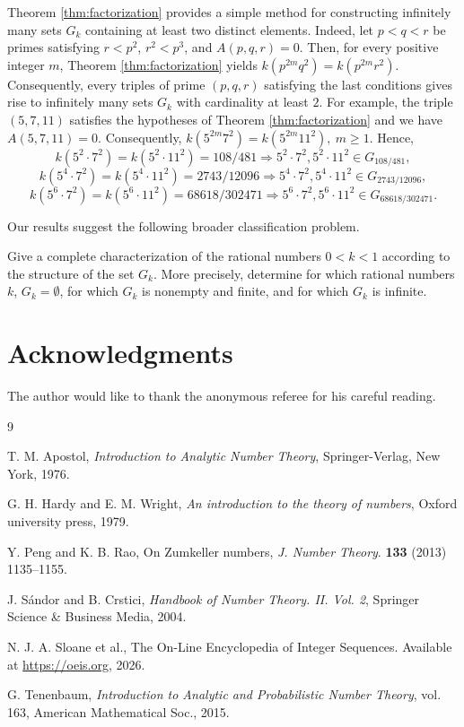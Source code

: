 \documentclass[12pt,reqno]{article}
\begin{document}
\begin{remark}
Theorem \ref{thm:factorization} provides a simple method for constructing infinitely many sets $G_k$ containing at least two distinct elements. Indeed, let \(p<q<r\) be primes satisfying \(r<p^2\), \(r^2<p^3\), and $A(p,q,r)=0$. Then, for every positive integer \(m\), Theorem \ref{thm:factorization} yields $k(p^{2m}q^2)=k(p^{2m}r^2)$. Consequently, every triples of prime \((p,q,r)\) satisfying the last conditions gives rise to infinitely many sets \(G_k\) with cardinality at least \(2\). For example, the triple $(5,7,11)$ satisfies the hypotheses of Theorem \ref{thm:factorization} and we have
$A(5,7,11)=0$. Consequently, $k(5^{2m}7^2)=k(5^{2m}11^2),\ m\ge1$. Hence,
\[
k(5^2\cdot7^2)=k(5^2\cdot11^2)=108/481\Rightarrow 5^2\cdot7^2, 5^2\cdot11^2\in G_{108/481},
\]
\[
k(5^4\cdot7^2)=k(5^4\cdot11^2)=2743/12096\Rightarrow 5^4\cdot7^2, 5^4\cdot11^2\in G_{2743/12096},
\]
\[
k(5^6\cdot7^2)=k(5^6\cdot11^2)=68618/302471\Rightarrow 5^6\cdot7^2, 5^6\cdot11^2\in G_{68618/302471}.
\]
\end{remark}

Our results suggest the following broader classification problem.
\begin{problem}
Give a complete characterization of the rational numbers $0<k<1$ according to the structure of the set
$G_k$. More precisely, determine for which rational numbers $k$, 
$G_k=\emptyset$, for which $G_k$ is nonempty and finite, and for which $G_k$ is infinite.
\end{problem}

\section{Acknowledgments}
The author would like to thank the anonymous referee for his careful reading. 

\begin{thebibliography}{9}

T. M. Apostol, \emph{Introduction to Analytic Number Theory}, Springer-Verlag, New York, 1976.

G. H. Hardy and E. M. Wright, \emph{An introduction to the theory of numbers}, Oxford university press, 1979.

Y. Peng and K. B. Rao, On Zumkeller numbers, \emph{J. Number Theory}. {\bf 133} (2013) 1135--1155.

J. S\'{a}ndor and B. Crstici, \emph{Handbook of Number Theory. II. Vol. 2}, Springer Science \& Business Media, 2004.

N. J. A. Sloane et al., The On-Line Encyclopedia of Integer Sequences. Available at \url{https://oeis.org}, 2026.

G. Tenenbaum,
\textit{Introduction to Analytic and Probabilistic Number Theory}, vol. 163,
American Mathematical Soc., 2015.


\end{thebibliography}
\end{document}
